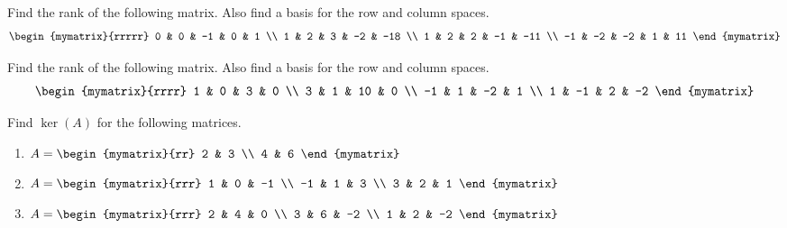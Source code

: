 \begin{enumialphparenastyle}
\begin{ex} Find the rank of the following matrix. Also find a basis for the row
and column spaces. 
\begin{equation*}
\begin{mymatrix}{rrrrr}
0 & 0 & -1 & 0 & 1 \\ 
1 & 2 & 3 & -2 & -18 \\ 
1 & 2 & 2 & -1 & -11 \\ 
-1 & -2 & -2 & 1 & 11
\end{mymatrix}
\end{equation*}
\end{ex}

\begin{ex} Find the rank of the following matrix. Also find a basis for the row
and column spaces.
\begin{equation*}
\begin{mymatrix}{rrrr}
1 & 0 & 3 & 0 \\ 
3 & 1 & 10 & 0 \\ 
-1 & 1 & -2 & 1 \\ 
1 & -1 & 2 & -2
\end{mymatrix}
\end{equation*}
\end{ex}

\begin{ex} Find $\ker \left(A \right)$ for the following matrices. 

\begin{enumerate}
\item 
$A = \begin{mymatrix}{rr}
2 & 3 \\
4 & 6 
\end{mymatrix} $

\item
$A = \begin{mymatrix}{rrr}
1 & 0 & -1 \\
-1 & 1 & 3 \\
3 & 2 & 1 
\end{mymatrix}$

\item 
$A = \begin{mymatrix}{rrr}
2 & 4 & 0 \\
3 & 6 & -2 \\
1 & 2 & -2
\end{mymatrix}$ 


\end{enumerate}
\end{ex}
\end{enumialphparenastyle}
